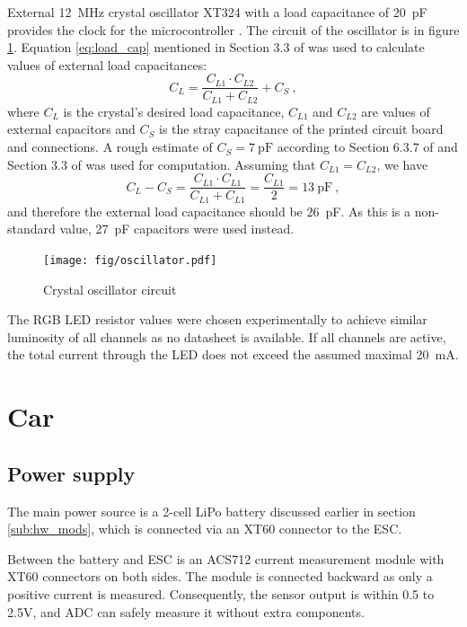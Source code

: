 External \SI{12}{\MHz} crystal oscillator XT324 with a load capacitance of \SI{20}{\pF} provides the clock for the microcontroller \cite{xt324_datasheet}. The circuit of the oscillator is in figure \ref{fig:osc}. Equation \ref{eq:load_cap} mentioned in Section 3.3 of \cite{osc_design_an} was used to calculate values of external load capacitances:
\begin{equation}
C_L = \frac{C_{L1} \cdot C_{L2}}{C_{L1} + C_{L2}} + C_S\ ,
\label{eq:load_cap}
\end{equation}
where $C_L$ is the crystal's desired load capacitance, $C_{L1}$ and $C_{L2}$ are values of external capacitors and $C_S$ is the stray capacitance of the printed circuit board and connections. A rough estimate of $C_S = \SI{7}{\pF}$ according to Section 6.3.7 of \cite{f303_datasheet} and Section 3.3 of \cite{osc_design_an} was used for computation. Assuming that $C_{L1} = C_{L2}$, we have
\begin{equation}
C_L - C_S = \frac{C_{L1} \cdot C_{L1}}{C_{L1} + C_{L1}} = \frac{C_{L1}}{2} = \SI{13}{\pF}\ ,
\end{equation}
and therefore the external load capacitance should be \SI{26}{\pF}. As this is a non-standard value, \SI{27}{\pF} capacitors were used instead.
\begin{figure}[h]
\centering
\texttt{[image: fig/oscillator.pdf]}
\caption{Crystal oscillator circuit}
\label{fig:osc}
\end{figure}

The RGB LED resistor values were chosen experimentally to achieve similar luminosity of all channels as no datasheet is available. If all channels are active, the total current through the LED does not exceed the assumed maximal \SI{20}{\mA}.

\section{Car}
\label{sec:real_car}
\subsection{Power supply}
The main power source is a 2-cell LiPo battery discussed earlier in section \ref{sub:hw_mods}, which is connected via an XT60 connector to the ESC.

Between the battery and ESC is an ACS712 current measurement module with XT60 connectors on both sides. The module is connected backward as only a positive current is measured. Consequently, the sensor output is within 0.5 to 2.5V, and ADC can safely measure it without extra components.

